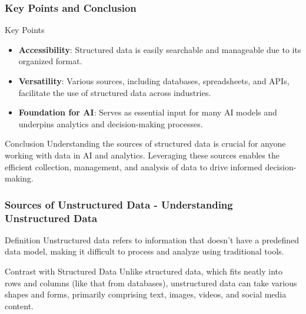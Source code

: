 \documentclass[aspectratio=169]{beamer}
\begin{document}
\begin{frame}[fragile]
  \frametitle{Key Points and Conclusion}
  \begin{block}{Key Points}
    \begin{itemize}
      \item \textbf{Accessibility}: Structured data is easily searchable and manageable due to its organized format.
      \item \textbf{Versatility}: Various sources, including databases, spreadsheets, and APIs, facilitate the use of structured data across industries.
      \item \textbf{Foundation for AI}: Serves as essential input for many AI models and underpins analytics and decision-making processes.
    \end{itemize}
  \end{block}

  \begin{block}{Conclusion}
    Understanding the sources of structured data is crucial for anyone working with data in AI and analytics. Leveraging these sources enables the efficient collection, management, and analysis of data to drive informed decision-making.
  \end{block}
\end{frame}

\begin{frame}[fragile]
    \frametitle{Sources of Unstructured Data - Understanding Unstructured Data}
    \begin{block}{Definition}
        Unstructured data refers to information that doesn’t have a predefined data model, making it difficult to process and analyze using traditional tools. 
    \end{block}
    \begin{block}{Contrast with Structured Data}
        Unlike structured data, which fits neatly into rows and columns (like that from databases), unstructured data can take various shapes and forms, primarily comprising text, images, videos, and social media content.
    \end{block}
\end{frame}
\end{document}
